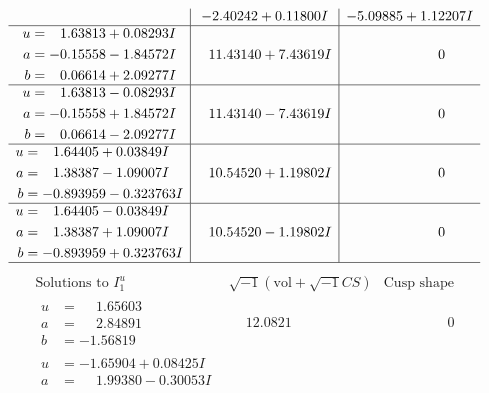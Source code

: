 \documentclass[1p]{elsarticle_modified}
\theoremstyle{definition}
\newcommand{\I}{\sqrt{-1}}
\begin{document}
$$\begin{array}{c|c|c}
 & -2.40242 + 0.11800 I & -5.09885 + 1.12207 I \\ \hline\begin{aligned}
u &= \phantom{-}1.63813 + 0.08293 I \\
a &= -0.15558 - 1.84572 I \\
b &= \phantom{-}0.06614 + 2.09277 I\end{aligned}
 & \phantom{-}11.43140 + 7.43619 I & \phantom{-0.000000 } 0 \\ \hline\begin{aligned}
u &= \phantom{-}1.63813 - 0.08293 I \\
a &= -0.15558 + 1.84572 I \\
b &= \phantom{-}0.06614 - 2.09277 I\end{aligned}
 & \phantom{-}11.43140 - 7.43619 I & \phantom{-0.000000 } 0 \\ \hline\begin{aligned}
u &= \phantom{-}1.64405 + 0.03849 I \\
a &= \phantom{-}1.38387 - 1.09007 I \\
b &= -0.893959 - 0.323763 I\end{aligned}
 & \phantom{-}10.54520 + 1.19802 I & \phantom{-0.000000 } 0 \\ \hline\begin{aligned}
u &= \phantom{-}1.64405 - 0.03849 I \\
a &= \phantom{-}1.38387 + 1.09007 I \\
b &= -0.893959 + 0.323763 I\end{aligned}
 & \phantom{-}10.54520 - 1.19802 I & \phantom{-0.000000 } 0\\
 \hline 
 \end{array}$$\newpage$$\begin{array}{c|c|c}  
\text{Solutions to }I^u_{1}& \I (\text{vol} + \sqrt{-1}CS) & \text{Cusp shape}\\
 \hline 
\begin{aligned}
u &= \phantom{-}1.65603\phantom{ +0.000000I} \\
a &= \phantom{-}2.84891\phantom{ +0.000000I} \\
b &= -1.56819\phantom{ +0.000000I}\end{aligned}
 & \phantom{-}12.0821\phantom{ +0.000000I} & \phantom{-0.000000 } 0 \\ \hline\begin{aligned}
u &= -1.65904 + 0.08425 I \\
a &= \phantom{-}1.99380 - 0.30053 I \\

\end{aligned}
\end{array}$$
\end{document}
